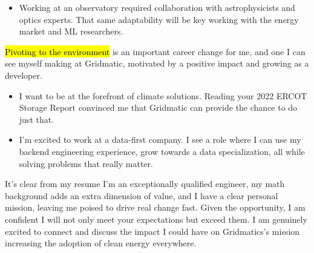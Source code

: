 \documentclass{tc_cv}
\begin{document}
\begin{adjustwidth}{40pt}{40pt}
\begin{itemize}
    \item Working at an observatory required collaboration with astrophysicists
      and optics experts. That same adaptability will be key working with the
      energy market and ML researchers.

  \end{itemize} \medskip

  \hl{Pivoting to the environment} is an important career change for me, and
  one I can see myself making at Gridmatic, motivated by a positive impact
  and growing as a developer.
  \begin{itemize}

    \item I want to be at the forefront of climate solutions. Reading your 2022
      ERCOT Storage Report convinced me that Gridmatic can provide the chance
      to do just that.

    \item I'm excited to work at a data-first company. I see a role where I can
      use my backend engineering experience, grow towards a data
      specialization, all while solving problems that really matter.

  \end{itemize} \medskip



  It's clear from my resume I'm an exceptionally qualified engineer, my math
  background adds an extra dimension of value, and I have a clear personal
  mission, leaving me poised to drive real change fast. Given the opportunity,
  I am confident I will not only meet your expectations but exceed them. I am
  genuinely excited to connect and discuss the impact I could have on
  Gridmatics's mission increasing the adoption of clean energy everywhere.



\end{adjustwidth}
\end{document}
